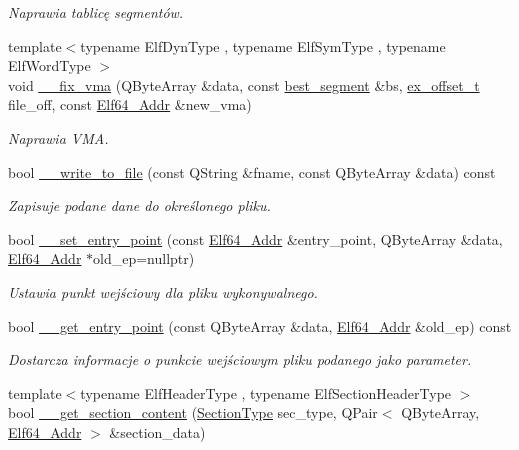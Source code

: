 \begin{DoxyCompactItemize}
\begin{DoxyCompactList}\small\item\em Naprawia tablicę segmentów. \end{DoxyCompactList}\item 
{\footnotesize template$<$typename Elf\-Dyn\-Type , typename Elf\-Sym\-Type , typename Elf\-Word\-Type $>$ }\\void \hyperlink{class_e_l_f_a5761261daab4f8008ca60129e0cc3652}{\-\_\-\-\_\-fix\-\_\-vma} (Q\-Byte\-Array \&data, const \hyperlink{class_e_l_f_acc32d4569fb28ff6c041c20870d8c2e7}{best\-\_\-segment} \&bs, \hyperlink{elffile_8h_aa2125ab7570efd47d79e62488cfe0207}{ex\-\_\-offset\-\_\-t} file\-\_\-off, const \hyperlink{elf_8h_aeed51d08e3a950d637f8ec1f0cd4ef65}{Elf64\-\_\-\-Addr} \&new\-\_\-vma)
\begin{DoxyCompactList}\small\item\em Naprawia V\-M\-A. \end{DoxyCompactList}\item 
bool \hyperlink{class_e_l_f_aaa749001fa45676fbfacd2009df1eaea}{\-\_\-\-\_\-write\-\_\-to\-\_\-file} (const Q\-String \&fname, const Q\-Byte\-Array \&data) const 
\begin{DoxyCompactList}\small\item\em Zapisuje podane dane do określonego pliku. \end{DoxyCompactList}\item 
bool \hyperlink{class_e_l_f_a746fc8b56c9d552229dba3c577df09d1}{\-\_\-\-\_\-set\-\_\-entry\-\_\-point} (const \hyperlink{elf_8h_aeed51d08e3a950d637f8ec1f0cd4ef65}{Elf64\-\_\-\-Addr} \&entry\-\_\-point, Q\-Byte\-Array \&data, \hyperlink{elf_8h_aeed51d08e3a950d637f8ec1f0cd4ef65}{Elf64\-\_\-\-Addr} $\ast$old\-\_\-ep=nullptr)
\begin{DoxyCompactList}\small\item\em Ustawia punkt wejściowy dla pliku wykonywalnego. \end{DoxyCompactList}\item 
bool \hyperlink{class_e_l_f_ac5cd0d9abbb2843fd9f77ff235818b5f}{\-\_\-\-\_\-get\-\_\-entry\-\_\-point} (const Q\-Byte\-Array \&data, \hyperlink{elf_8h_aeed51d08e3a950d637f8ec1f0cd4ef65}{Elf64\-\_\-\-Addr} \&old\-\_\-ep) const 
\begin{DoxyCompactList}\small\item\em Dostarcza informacje o punkcie wejściowym pliku podanego jako parameter. \end{DoxyCompactList}\item 
{\footnotesize template$<$typename Elf\-Header\-Type , typename Elf\-Section\-Header\-Type $>$ }\\bool \hyperlink{class_e_l_f_a104fdaeda96cbf14cd5d0eceb1356355}{\-\_\-\-\_\-get\-\_\-section\-\_\-content} (\hyperlink{class_e_l_f_abaebdfb7048441e430684d68df8d73d1}{Section\-Type} sec\-\_\-type, Q\-Pair$<$ Q\-Byte\-Array, \hyperlink{elf_8h_aeed51d08e3a950d637f8ec1f0cd4ef65}{Elf64\-\_\-\-Addr} $>$ \&section\-\_\-data)

\end{DoxyCompactItemize}
